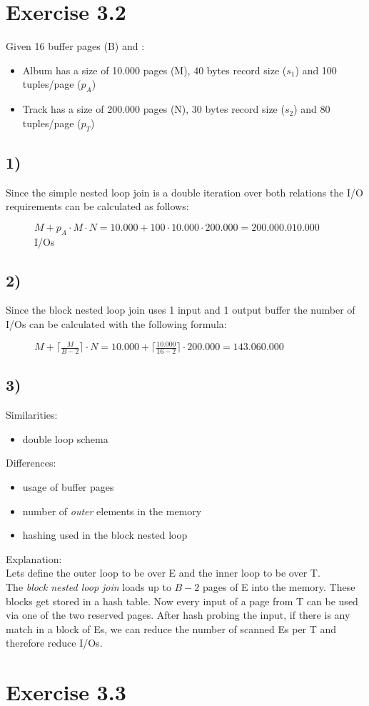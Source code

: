 \documentclass[12pt]{article}
\begin{document}
	\newpage
	
	\section*{Exercise 3.2}
	Given 16 buffer pages (B) and :
	\begin{itemize}
		\item Album has a size of 10.000 pages (M), 40 bytes record size ($s_1$) and 100 tuples/page ($p_A$)
		\item Track has a size of 200.000 pages (N), 30 bytes record size ($s_2$) and 80 tuples/page ($p_T$)
	\end{itemize}
	\subsection*{1)}		
		Since the simple nested loop join is a double iteration over both relations the I/O requirements can be calculated as follows:\\
		\begin{figure}[H]
			\centering
			$M+p_A \cdot M \cdot N = 10.000 + 100 \cdot 10.000 \cdot 200.000 = 200.000.010.000$ I/Os
		\end{figure}
	\subsection*{2)}
		Since the block nested loop join uses 1 input and 1 output buffer the number of I/Os can be calculated with the following formula:
		\begin{figure}[H]
			\centering
			$M + \lceil \frac{M}{B-2} \rceil \cdot N = 10.000 + \lceil \frac{10.000}{16-2} \rceil \cdot 200.000 = 143.060.000$
		\end{figure}
	\subsection*{3)}
		Similarities:
		\begin{itemize}
			\item double loop schema
		\end{itemize}
		Differences:
		\begin{itemize}
			\item usage of buffer pages 
			\item number of \textit{outer} elements in the memory
			\item hashing used in the block nested loop
		\end{itemize}
	
		Explanation:\\
		Lets define the outer loop to be over E and the inner loop to be over T.\\
		The \textit{block nested loop join} loads up to $B-2$ pages of E into the memory. These blocks get stored in a hash table. Now every input of a page from T can be used via one of the two reserved pages. After hash probing the input, if there is any match in a block of Es, we can reduce the number of scanned Es per T and therefore reduce I/Os.
		
	\section*{Exercise 3.3}
		
\end{document}
